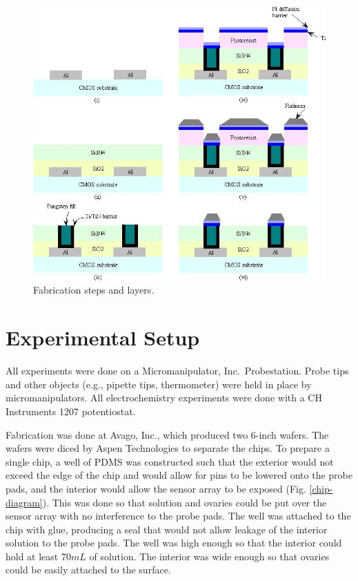 \documentclass[twocolumn]{article}
\begin{document}
\begin{figure}
\centering
\includegraphics[width=\linewidth]{figures/fabsteps.jpg}
\caption{Fabrication steps and layers.}
\label{fab-steps}
\end{figure}

\section{Experimental Setup}

All experiments were done on a Micromanipulator, Inc.\ Probestation. Probe tips and other objects (e.g., pipette tips, thermometer) were held in place by micromanipulators. All electrochemistry experiments were done with a CH Instruments 1207 potentiostat.

Fabrication was done at Avago, Inc., which produced two 6-inch wafers. The wafers were diced by Aspen Technologies to separate the chips. To prepare a single chip, a well of PDMS was constructed such that the exterior would not exceed the edge of the chip and would allow for pins to be lowered onto the probe pads, and the interior would allow the sensor array to be exposed (Fig. \ref{chip-diagram}). This was done so that solution and ovaries could be put over the sensor array with no interference to the probe pads. The well was attached to the chip with glue, producing a seal that would not allow leakage of the interior solution to the probe pads. The well was high enough so that the interior could hold at least 70$mL$ of solution. The interior was wide enough so that ovaries could be easily attached to the surface.
\end{document}
